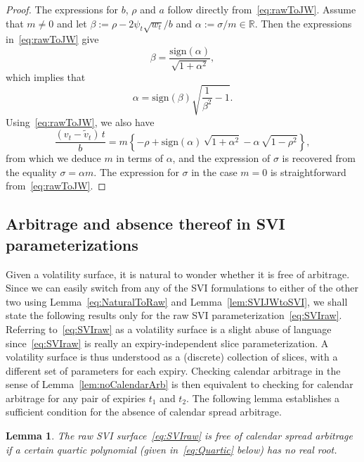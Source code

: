 \documentclass[12pt]{article}
\newtheorem{lemma}{Lemma}[section]
\numberwithin{equation}{section}
\newcommand{\sgn}{\mathrm{sign}}
\begin{document}
\begin{proof}
The expressions for $b$, $\rho$ and $a$ follow directly from~\eqref{eq:rawToJW}.
Assume that $m\ne 0$ and let $\beta:=\rho-2\psi_t \sqrt{w_t}/b$ and $\alpha:=\sigma/m\in\mathbb{R}$.
Then the expressions in~\eqref{eq:rawToJW} give
$$\beta = \frac{\sgn\left(\alpha\right)}{\sqrt{1+\alpha^2}},$$
which implies that
$$\alpha = \sgn(\beta)\sqrt{\frac{1}{\beta^2}-1}.$$
Using~\eqref{eq:rawToJW}, we also have
$$
\frac{\left(v_t-\widetilde v_{t}\right)\,t}{b}
=m\left\{-\rho+\sgn(\alpha)\,\sqrt{1+\alpha^2}-\alpha\,\sqrt{1-\rho^2}\right\},
$$
from which we deduce $m$ in terms of $\alpha$, and
the expression of $\sigma$ is recovered from the equality $\sigma=\alpha m$.
The expression for $\sigma$ in the case $m=0$ is straightforward from~\eqref{eq:rawToJW}.
\end{proof}

\subsection{Arbitrage and absence thereof in SVI parameterizations}
Given a volatility surface, it is natural to wonder whether it is free of arbitrage.
Since we can easily switch from any of the SVI formulations to either of the other two using
Lemma~\ref{eq:NaturalToRaw} and Lemma~\ref{lem:SVIJWtoSVI}, we shall state the following results only for the raw SVI parameterization~\eqref{eq:SVIraw}.
Referring to~\eqref{eq:SVIraw} as a volatility surface is a slight abuse of language 
since~\eqref{eq:SVIraw} is really an expiry-independent slice parameterization.
A volatility surface is thus understood as a (discrete) collection of slices, with a different set of parameters for each expiry.
Checking calendar arbitrage in the sense of Lemma~\ref{lem:noCalendarArb} is then equivalent to checking 
for calendar arbitrage for any pair of expiries $t_1$ and $t_2$.
The following lemma establishes a sufficient condition for the absence of calendar spread arbitrage.


\begin{lemma}
The raw SVI surface~\eqref{eq:SVIraw} is free of calendar spread arbitrage if a certain quartic polynomial (given in~\eqref{eq:Quartic} below) has no real root.
\end{lemma}
\end{document}
